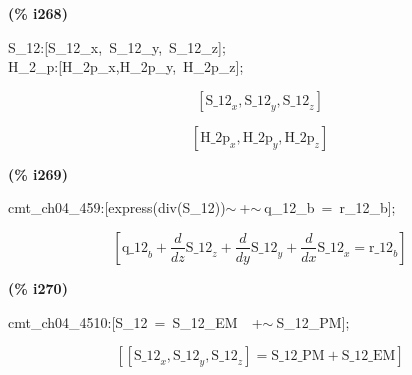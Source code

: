 \documentclass[fleqn]{article}
\begin{document}
\noindent
\begin{minipage}[t]{4.000000em}\color{red}\bfseries
(\% i268)	
\end{minipage}
\begin{minipage}[t]{\textwidth}\color{blue}
S\_12:[S\_12\_x,\ S\_12\_y,\ S\_12\_z];\\
H\_2\_p:[H\_2p\_x,H\_2p\_y,\ H\_2p\_z];
\end{minipage}
\[\displaystyle \tag{\% o267} 
\left[ {{\ensuremath{\mathrm{S\_ 12}}}_x}\operatorname{,}{{\ensuremath{\mathrm{S\_ 12}}}_y}\operatorname{,}{{\ensuremath{\mathrm{S\_ 12}}}_z}\right] \mbox{}\]

\[\tag{\% o268} 
\left[ {{\ensuremath{\mathrm{H\_ 2p}}}_x}\operatorname{,}{{\ensuremath{\mathrm{H\_ 2p}}}_y}\operatorname{,}{{\ensuremath{\mathrm{H\_ 2p}}}_z}\right] \mbox{}
\]


\noindent
\begin{minipage}[t]{4.000000em}\color{red}\bfseries
(\% i269)	
\end{minipage}
\begin{minipage}[t]{\textwidth}\color{blue}
cmt\_ch04\_459:[express(div(S\_12))\ensuremath{\sim\ }+\ensuremath{\sim\ }q\_12\_b\ =\ r\_12\_b];
\end{minipage}
\[\displaystyle \tag{\% o269} 
\left[ {{\ensuremath{\mathrm{q\_ 12}}}_b}+\frac{d}{d z} {{\ensuremath{\mathrm{S\_ 12}}}_z}+\frac{d}{d y} {{\ensuremath{\mathrm{S\_ 12}}}_y}+\frac{d}{d x} {{\ensuremath{\mathrm{S\_ 12}}}_x}={{\ensuremath{\mathrm{r\_ 12}}}_b}\right] \mbox{}
\]


\noindent
\begin{minipage}[t]{4.000000em}\color{red}\bfseries
(\% i270)	
\end{minipage}
\begin{minipage}[t]{\textwidth}\color{blue}
cmt\_ch04\_4510:[S\_12\ =\ S\_12\_EM\ \ +\ensuremath{\sim\ }S\_12\_PM];
\end{minipage}
\[\displaystyle \tag{\% o270} 
\left[ \left[ {{\ensuremath{\mathrm{S\_ 12}}}_x}\operatorname{,}{{\ensuremath{\mathrm{S\_ 12}}}_y}\operatorname{,}{{\ensuremath{\mathrm{S\_ 12}}}_z}\right] =\ensuremath{\mathrm{S\_ 12\_ PM}}+\ensuremath{\mathrm{S\_ 12\_ EM}}\right] \mbox{}
\]
\end{document}
